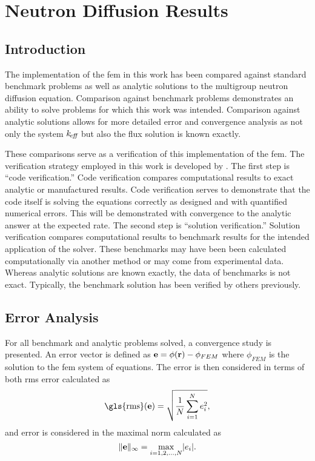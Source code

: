\chapter{Neutron Diffusion Results}
\label{ch:diffusionResults}

\section{Introduction}
  The implementation of the \gls{fem} in this work has been compared
  against standard benchmark problems as well as analytic solutions to the
  multigroup neutron diffusion equation. Comparison against benchmark problems
  demonstrates an ability to solve problems for which this work was intended.
  Comparison against analytic solutions allows for more detailed error and
  convergence analysis as not only the system $k_{\!\mbox{\scriptsize \em eff}}$ but also the flux solution
  is known exactly. 

  These comparisons serve as a verification of this implementation of the
  \gls{fem}. The verification strategy employed in this work is developed by
  \textcite{oberkampf}. The first step is ``code verification.'' Code
  verification compares computational results to exact analytic or manufactured
  results. Code verification serves to demonstrate that the code itself is
  solving the equations correctly as designed and with quantified numerical
  errors. This will be demonstrated with convergence to the analytic answer at
  the expected rate. The second step is ``solution verification.'' Solution
  verification compares computational results to benchmark results for the
  intended application of the solver. These benchmarks may have been been
  calculated computationally via another method or may come from experimental
  data. Whereas analytic solutions are known exactly, the data of benchmarks is 
  not exact. Typically, the benchmark solution has been verified by others 
  previously.

\section{Error Analysis}
  For all benchmark and analytic problems solved, a convergence study is 
  presented. An error vector is defined as $\mathbf{e} = \phi(\mathbf{r}) - \phi_{FEM}$ where
  $\phi_{FEM}$ is the solution to the \gls{fem} system of equations. 
  The error is then considered in terms of both \gls{rms} error calculated as 
  \begin{equation} 
    \label{eq:rms}
    \text{\gls{rms}}(\ve) = \sqrt{\frac{1}{N} \sum_{i=1}^{N} e_i^2},
  \end{equation}
  and error is considered in the maximal norm calculated as
  \begin{equation} 
    \label{eq:infnorm}
    \|\mathbf{e}\|_{\infty} = \max_{i=1,2,\ldots,N} \lvert e_i \rvert.
  \end{equation}

